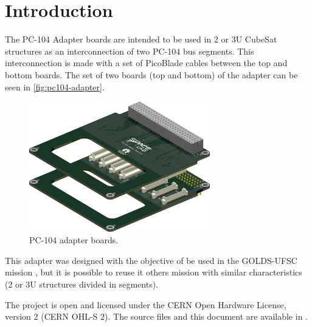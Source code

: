 %
%
%
%
%

%
%
%
%
%
%

\chapter{Introduction} \label{ch:introduction}

The PC-104 Adapter boards are intended to be used in 2 or 3U CubeSat structures as an interconnection of two PC-104 bus segments. This interconnection is made with a set of PicoBlade \cite{picoblade} cables between the top and bottom boards. The set of two boards (top and bottom) of the adapter can be seen in \autoref{fig:pc104-adapter}.

\begin{figure}[!htb]
    \begin{center}
        \includegraphics[width=0.7\textwidth]{figures/pc104-adapter}
        \caption{PC-104 adapter boards.}
        \label{fig:pc104-adapter}
    \end{center}
\end{figure}

This adapter was designed with the objective of be used in the GOLDS-UFSC mission \cite{golds-ufsc}, but it is possible to reuse it others mission with similar characteristics (2 or 3U structures divided in segments).

The project is open and licensed under the CERN Open Hardware License, version 2 (CERN OHL-S 2). The source files and this document are available in \cite{pc104-adapter}.
